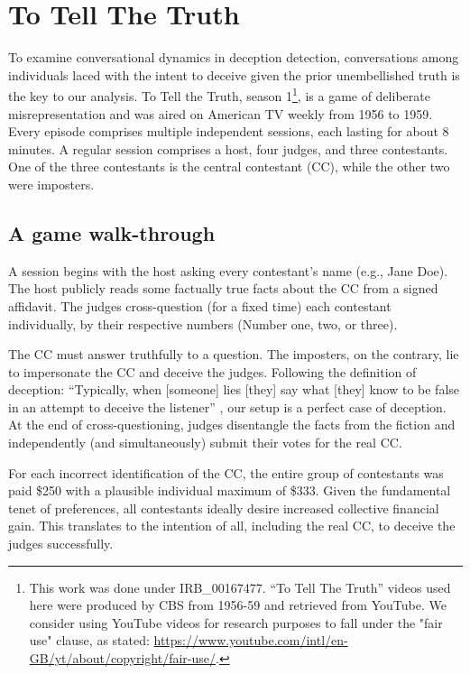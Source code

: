 \section{To Tell The Truth}
To examine conversational dynamics in deception detection, conversations among individuals laced with the intent to deceive given the prior unembellished truth is the key to our analysis. To Tell the Truth, season 1\footnote{This work was done under IRB\_00167477. ``To Tell The Truth'' videos used here were produced by CBS from 1956-59 and retrieved from YouTube. We consider using YouTube videos for research purposes to fall under the "fair use" clause, as stated: \url{https://www.youtube.com/intl/en-GB/yt/about/copyright/fair-use/}.}, is a game of deliberate misrepresentation and was aired on American TV weekly from 1956 to 1959. Every episode comprises multiple independent sessions, each lasting for about 8 minutes. A regular session comprises a host, four judges, and three contestants. One of the three contestants is the central contestant (CC), while the other two were imposters. 

\subsection{A game walk-through}
A session begins with the host asking every contestant's name (e.g., Jane Doe). The host publicly reads some factually true facts about the CC from a signed affidavit. The judges cross-question (for a fixed time) each contestant individually, by their respective numbers (Number one, two, or three).

The CC must answer truthfully to a question. The imposters, on the contrary, lie to impersonate the CC and deceive the judges. Following the definition of deception: ``Typically, when [someone] lies [they] say what [they] know to be false in an attempt to deceive the listener'' \cite{siegler1966lying}, our setup is a perfect case of deception. At the end of cross-questioning, judges disentangle the facts from the fiction and independently (and simultaneously) submit their votes for the real CC.

For each incorrect identification of the CC, the entire group of contestants was paid \$250 with a plausible individual maximum of \$333. Given the fundamental tenet of preferences, all contestants ideally desire increased collective financial gain. This translates to the intention of all, including the real CC, to deceive the judges successfully.

